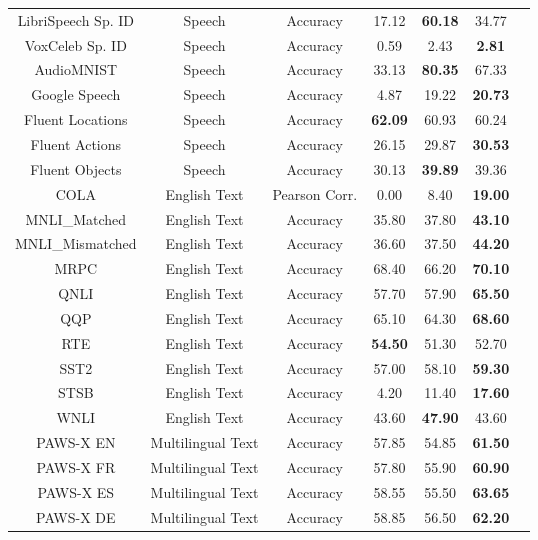 \documentclass{article}
\begin{document}
\begin{table}
\begin{tabular}{ccccccc}
LibriSpeech Sp. ID     & Speech   & Accuracy    & 17.12 & \textbf{60.18} & 34.77  \\
VoxCeleb Sp. ID        & Speech   & Accuracy       & 0.59  & 2.43  & \textbf{2.81}   \\
AudioMNIST       & Speech   & Accuracy       & 33.13 & \textbf{80.35} & 67.33  \\
Google Speech    & Speech   & Accuracy       & 4.87  & 19.22 & \textbf{20.73}  \\
Fluent Locations & Speech   & Accuracy       & \textbf{62.09} & 60.93 & 60.24  \\
Fluent Actions   & Speech   & Accuracy       & 26.15 & 29.87 & \textbf{30.53}  \\
Fluent Objects   & Speech   & Accuracy       & 30.13 & \textbf{39.89} & 39.36  \\
COLA             & English Text     & Pearson Corr.       & 0.00     & 8.40  & \textbf{19.00}  \\
MNLI\_Matched    & English Text     & Accuracy       & 35.80 & 37.80 & \textbf{43.10}  \\
MNLI\_Mismatched & English Text     & Accuracy       & 36.60 & 37.50 & \textbf{44.20}  \\
MRPC             & English Text     & Accuracy       & 68.40 & 66.20 & \textbf{70.10}  \\
QNLI             & English Text     & Accuracy       & 57.70 & 57.90 & \textbf{65.50}  \\
QQP              & English Text     & Accuracy       & 65.10 & 64.30 & \textbf{68.60}  \\
RTE              & English Text     & Accuracy       & \textbf{54.50} & 51.30 & 52.70  \\
SST2             & English Text     & Accuracy       & 57.00 & 58.10 & \textbf{59.30}  \\
STSB             & English Text     & Accuracy       & 4.20  & 11.40 & \textbf{17.60}  \\
WNLI             & English Text     & Accuracy       & 43.60 & \textbf{47.90} & 43.60  \\
PAWS-X EN  & Multilingual Text  & Accuracy  & 57.85 & 54.85 & \textbf{61.50}  \\
PAWS-X FR  & Multilingual Text  & Accuracy  & 57.80 & 55.90 & \textbf{60.90}  \\
PAWS-X ES  & Multilingual Text  & Accuracy  & 58.55 & 55.50 & \textbf{63.65}  \\
PAWS-X DE  & Multilingual Text  & Accuracy  & 58.85 & 56.50 & \textbf{62.20}  \\

\end{tabular}
\end{table}
\end{document}
